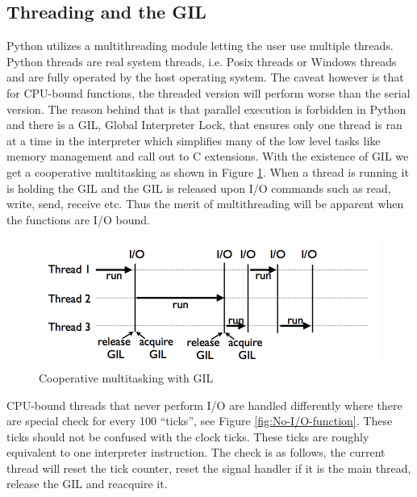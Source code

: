 \documentclass[10pt,twocolumn,letterpaper]{article}
\begin{document}
\subsection{Threading and the GIL}

Python utilizes a multithreading module letting the user use multiple
threads. Python threads are real system threads, i.e. Posix threads
or Windows threads and are fully operated by the host operating system.
The caveat however is that for CPU-bound functions, the threaded version
will perform worse than the serial version. The reason behind that
is that parallel execution is forbidden in Python and there is a GIL,
Global Interpreter Lock, that ensures only one thread is ran at a
time in the interpreter which simplifies many of the low level tasks
like memory management and call out to C extensions. With the existence
of GIL we get a cooperative multitasking as shown in Figure \ref{fig:Cooperative-multitasking-with}.
When a thread is running it is holding the GIL and the GIL is released
upon I/O commands such as read, write, send, receive etc. Thus the
merit of multithreading will be apparent when the functions are I/O
bound. 

\begin{figure}[htbp] 
\begin{center}
\includegraphics[scale=0.3]{figure/threads_IO.png}
\end{center}
\caption{Cooperative multitasking with GIL}
\label{fig:Cooperative-multitasking-with}
\end{figure}


CPU-bound threads that never perform I/O are handled differently where
there are special check for every 100 ``ticks'', see Figure \ref{fig:No-I/O-function}.
These ticks should not be confused with the clock ticks. These ticks
are roughly equivalent to one interpreter instruction. The check is
as follows, the current thread will reset the tick counter, reset
the signal handler if it is the main thread, release the GIL and reacquire
it.
\end{document}
